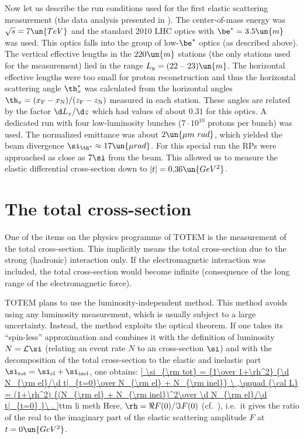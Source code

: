 
Now let us describe the run conditions used for the first elastic scattering measurement (the data analysis presented in ). The center-of-mass energy was $\sqrt s = 7\un{TeV}$ and the standard 2010 LHC optics with $\be^* = 3.5\un{m}$ was used. This optics falls into the group of low-$\be^*$ optics (as described above). The vertical effective lengths in the $220\un{m}$ stations (the only stations used for the measurement) lied in the range $L_y = (22 \hbox{ -- } 23)\un{m}$. The horizontal effective lengths were too small for proton reconstruction and thus the horizontal scattering angle $\th_x^*$ was calculated from the horizontal angles $\th_x = (x_{\rm F} - x_{\rm N})/(z_{\rm F} - z_{\rm N})$ measured in each station. These angles are related by the factor $\d L_{x}/\d z$ which had values of about $0.31$ for this optics. A dedicated run with four low-luminosity bunches ($7\cdot10^{10}$ protons per bunch) was used. The normalized emittance was about $2\un{\mu m\ rad}$, which yielded the beam divergence $\si_{\th^*} \approx 17\un{\mu rad}$. For this special run the RPs were approached as close as $7\si$ from the beam. This allowed us to measure the elastic differential cross-section down to $|t| = 0.36\un{GeV^2}$.



\section[ttm tcs]{The total cross-section}

One of the items on the physics programme of TOTEM is the measurement of the total cross-section. This implicitly means the total cross-section due to the strong (hadronic) interaction only. If the electromagnetic interaction was included, the total cross-section would become infinite (consequence of the long range of the electromagnetic force).

TOTEM plans to use the luminosity-independent method. This method avoids using any luminosity measurement, which is usually subject to a large uncertainty. Instead, the method exploits the optical theorem. If one takes its ``spin-less'' approximation  and combines it with the definition of luminosity $N = {\cal L} \si$ (relating an event rate $N$ to an cross-section $\si$) and with the decomposition of the total cross-section to the elastic and inelastic part $\si_{\rm tot} = \si_{\rm el} + \si_{\rm inel}$, one obtains:
\eqref{
	\si_{\rm tot} = {1\over 1+\rh^2} {\d N_{\rm el}/\d t|_{t=0}\over N_{\rm el} + N_{\rm inel}}
	\ ,\qquad
	{\cal L} = (1+\rh^2) {(N_{\rm el} + N_{\rm inel})^2\over \d N_{\rm el}/\d t|_{t=0} }\ .
}{ttm li meth}
Here, $\rh = \Re F(0) / \Im F(0)$ (cf.~), i.e.~it gives the ratio of the real to the imaginary part of the elastic scattering amplitude $F$ at $t = 0\un{GeV^2}$.

